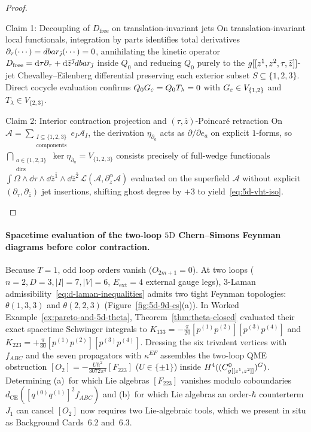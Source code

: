 \begin{proof}\leavevmode
\begin{proofpart}{Claim 1: Decoupling of $D_{\mathrm{free}}$ on translation-invariant jets}
On translation-invariant local functionals, integration by parts identifies total derivatives $\partial_\tau(\cdots) = dbar_{\bar{\jmath}}(\cdots) = 0$, annihilating the kinetic operator $D_{\mathrm{free}} = \mathrm{d}\tau\partial_\tau + \mathrm{d}\bar{z}^{\bar{\jmath}}dbar_{\bar{\jmath}}$ inside $Q_0$ and reducing $Q_0$ purely to the $g[[z^1,z^2,\tau,\bar{z}]]$-jet Chevalley--Eilenberg differential preserving each exterior subset $S \subseteq \{1,2,3\}$. Direct cocycle evaluation confirms $Q_0 G_\varepsilon = Q_0 T_\lambda = 0$ with $G_\varepsilon \in V_{\{1,2\}}$ and $T_\lambda \in V_{\{2,3\}}$.
\end{proofpart}
\begin{proofpart}{Claim 2: Interior contraction projection and $(\tau,\bar{z})$-Poincar\'e retraction}
On $\mathcal{A} = \sum_{\substack{I\subseteq\{1,2,3\}\\\mathrm{components}}}e_I\mathcal{A}_I$, the derivation $\eta_{\partial_{a}}$ acts as $\partial/\partial e_a$ on explicit $1$-forms, so $\bigcap_{\substack{a\in\{1,2,3\}\\\mathrm{dirs}}}\ker\eta_{\partial_a} = V_{\{1,2,3\}}$ consists precisely of full-wedge functionals $\int\Omega\wedge\dd\tau\wedge\dd\bar{z}^{\bar{1}}\wedge\dd\bar{z}^{\bar{2}}\,\mathcal{L}(\mathcal{A},\partial_z^\alpha\mathcal{A})$ evaluated on the superfield $\mathcal{A}$ without explicit $(\partial_\tau,\partial_{\bar{z}})$ jet insertions, shifting ghost degree by $+3$ to yield~\eqref{eq:5d-vht-iso}.
\end{proofpart}
\end{proof}

\paragraph{Spacetime evaluation of the two-loop $5\mathrm{D}$ Chern--Simons Feynman diagrams before color contraction.}
Because $T = 1$, odd loop orders vanish ($O_{2m+1} = 0$). At two loops ($n = 2, D = 3, |I| = 7, |V| = 6$, $E_{\mathrm{ext}} = 4$ external gauge legs), $3$-Laman admissibility~\eqref{eq:d-laman-inequalities} admits two tight Feynman topologies: $\theta(1,3,3)$ and $\theta(2,2,3)$ (Figure~\ref{fig:5d-9d-cs}(a)). In Worked Example~\ref{ex:pareto-and-5d-theta}, Theorem~\ref{thm:theta-closed} evaluated their exact spacetime Schwinger integrals to $K_{133} = -\frac{\pi}{20}[p^{(1)}p^{(2)}][p^{(3)}p^{(4)}]$ and $K_{223} = +\frac{\pi}{30}[p^{(1)}p^{(2)}][p^{(3)}p^{(4)}]$. Dressing the six trivalent vertices with $f_{ABC}$ and the seven propagators with $\kappa^{EF}$ assembles the two-loop QME obstruction $[O_2] = -\frac{U\hbar^2}{3072\pi^4}[F_{223}]$ ($U \in \{\pm 1\}$) inside $H^4((C^0_{g[[z^1,z^2]]})^G)$. Determining (a)~for which Lie algebras $[F_{223}]$ vanishes modulo coboundaries $d_{\mathrm{CE}}([q^{(0)}q^{(1)}]^2 f_{ABC})$ and (b)~for which Lie algebras an order-$\hbar$ counterterm $J_1$ can cancel $[O_2]$ now requires two Lie-algebraic tools, which we present in situ as Background Cards~6.2 and~6.3.

